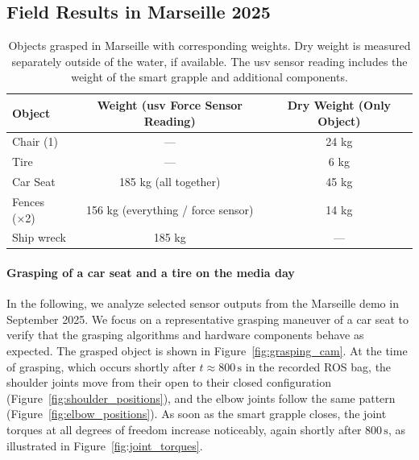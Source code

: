 \documentclass[a4paper,11pt]{article}
\begin{document}
\subsection{Field Results in Marseille 2025}
\begin{table}[h!]
\centering
\begin{tabular}{|l|c|c|}
\hline
\textbf{Object} & \textbf{Weight (\gls{usv} Force Sensor Reading)} & \textbf{Dry Weight (Only Object)} \\ \hline
Chair (1)           &      ---                             & 24 kg                                \\ \hline
Tire            &  ---                                  & 6 kg                             \\ \hline
Car Seat         & 185 kg (all together)                  & 45 kg                         \\ \hline
Fences (×2)     & 156 kg (everything / force sensor)     & 14 kg                           \\ \hline
Ship wreck     & 185 kg                   & ---                             \\ \hline
\end{tabular}
\caption{Objects grasped in Marseille with corresponding weights. Dry weight is measured separately outside of the water, if available. The \gls{usv} sensor reading includes the weight of the smart grapple and additional components.} %
\label{tab:marseille_objects}
\end{table}


\paragraph{Grasping of a car seat and a tire on the media day}
In the following, we analyze selected sensor outputs from the Marseille demo in September 2025. We focus on a representative grasping maneuver of a car seat to verify that the grasping algorithms and hardware components behave as expected.  The grasped object is shown in Figure~\ref{fig:grasping_cam}. At the time of grasping, which occurs shortly after \(t \approx 800\,\mathrm{s}\) in the recorded ROS bag, the shoulder joints move from their open to their closed configuration (Figure~\ref{fig:shoulder_positions}), and the elbow joints follow the same pattern (Figure~\ref{fig:elbow_positions}). As soon as the smart grapple closes, the joint torques at all degrees of freedom increase noticeably, again shortly after \(800\,\mathrm{s}\), as illustrated in Figure~\ref{fig:joint_torques}.
\end{document}
